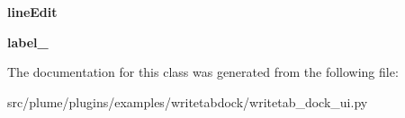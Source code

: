 \begin{DoxyCompactItemize}
\item 
{\bfseries line\+Edit}\hypertarget{classplume-creator_1_1src_1_1plume_1_1plugins_1_1examples_1_1writetabdock_1_1writetab__dock__ui_1_1_ui___write_tab_dock_a9c683c6d08b64928ca415b722da32537}{}\label{classplume-creator_1_1src_1_1plume_1_1plugins_1_1examples_1_1writetabdock_1_1writetab__dock__ui_1_1_ui___write_tab_dock_a9c683c6d08b64928ca415b722da32537}

\item 
{\bfseries label\+\_}\hypertarget{classplume-creator_1_1src_1_1plume_1_1plugins_1_1examples_1_1writetabdock_1_1writetab__dock__ui_1_1_ui___write_tab_dock_a0b694261a0b526f4da460bd2eceab1ce}{}\label{classplume-creator_1_1src_1_1plume_1_1plugins_1_1examples_1_1writetabdock_1_1writetab__dock__ui_1_1_ui___write_tab_dock_a0b694261a0b526f4da460bd2eceab1ce}

\end{DoxyCompactItemize}


The documentation for this class was generated from the following file\+:\begin{DoxyCompactItemize}
\item 
src/plume/plugins/examples/writetabdock/writetab\+\_\+dock\+\_\+ui.\+py\end{DoxyCompactItemize}
